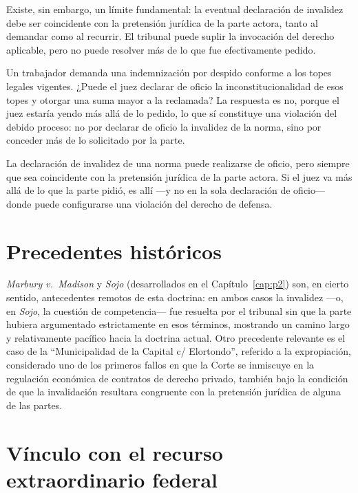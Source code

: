 \documentclass[12pt,oneside]{book}
\begin{document}
Existe, sin embargo, un límite fundamental: la eventual declaración de invalidez
debe ser coincidente con la pretensión jurídica de la parte actora, tanto al
demandar como al recurrir. El tribunal puede suplir la invocación del derecho
aplicable, pero no puede resolver más de lo que fue efectivamente pedido.

\begin{exbox}
Un trabajador demanda una indemnización por despido conforme a los topes legales
vigentes. ¿Puede el juez declarar de oficio la inconstitucionalidad de esos topes
y otorgar una suma mayor a la reclamada? La respuesta es no, porque el juez
estaría yendo más allá de lo pedido, lo que sí constituye una violación del debido
proceso: no por declarar de oficio la invalidez de la norma, sino por conceder más
de lo solicitado por la parte.
\end{exbox}

\begin{impbox}
La declaración de invalidez de una norma puede realizarse de oficio, pero siempre
que sea coincidente con la pretensión jurídica de la parte actora. Si el juez va
más allá de lo que la parte pidió, es allí —y no en la sola declaración de
oficio— donde puede configurarse una violación del derecho de defensa.
\end{impbox}

\section{Precedentes históricos}

\textit{Marbury v.\ Madison} y \textit{Sojo} (desarrollados en el
Capítulo~\ref{cap:p2}) son, en cierto sentido, antecedentes remotos de esta
doctrina: en ambos casos la invalidez —o, en \textit{Sojo}, la cuestión de
competencia— fue resuelta por el tribunal sin que la parte hubiera argumentado
estrictamente en esos términos, mostrando un camino largo y relativamente pacífico
hacia la doctrina actual. Otro precedente relevante es el caso de la
``Municipalidad de la Capital c/ Elortondo'', referido a la expropiación,
considerado uno de los primeros fallos en que la Corte se inmiscuye en la
regulación económica de contratos de derecho privado, también bajo la condición
de que la invalidación resultara congruente con la pretensión jurídica de alguna
de las partes.

\section{Vínculo con el recurso extraordinario federal}
\end{document}
